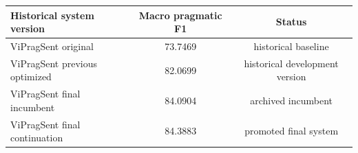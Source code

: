 \small
\begin{tabular}{lcc}
\toprule
Historical system version & Macro pragmatic F1 & Status \\
\midrule
ViPragSent original & 73.7469 & historical baseline \\
ViPragSent previous optimized & 82.0699 & historical development version \\
ViPragSent final incumbent & 84.0904 & archived incumbent \\
ViPragSent final continuation & 84.3883 & promoted final system \\
\bottomrule
\end{tabular}%
